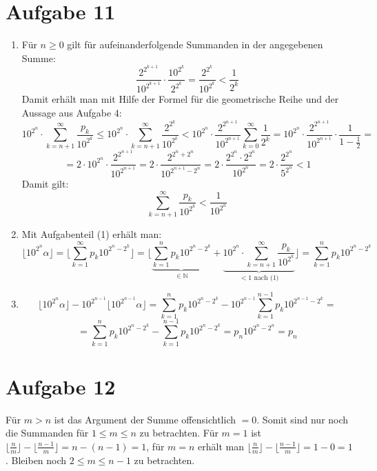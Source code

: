 \section*{Aufgabe 11}
\begin{enumerate}[(1)]

\item Für $n \geq 0 $ gilt für aufeinanderfolgende Summanden in der angegebenen Summe:
\[   \frac{2^{2^{k+1}}}{10^{2^{k+1}}} \cdot \frac{10^{2^{k}}}{2^{2^{k}}}  = \frac{2^{2^{k}}}{10^{2^{k}}} < \frac{1}{2^k} \]
Damit erhält man mit Hilfe der Formel für die geometrische Reihe und der Aussage aus Aufgabe 4:
\[ 10^{2^{n}} \cdot \sum_{k = n+1}^{\infty}{\frac{p_k}{10^{2^k}}} \leq 10^{2^{n}} \cdot  \sum_{k = n+1}^{\infty}{\frac{2^{2^k}}{10^{2^k}}} < 10^{2^{n}} \cdot  \frac{2^{2^{n+1}}}{10^{2^{n+1}}} \sum_{k=0}^{\infty} {\frac{1}{2^k}} =  10^{2^{n}} \cdot \frac{2^{2^{n+1}}}{10^{2^{n+1}}} \cdot \frac{1}{1 - \frac{1}{2}}  = \]
\[ = 2 \cdot 10^{2^{n}} \cdot \frac{2^{2^{n+1}}}{10^{2^{n+1}}}  = 2 \cdot \frac{2^{2^n + 2^n}}{10^{2^{n+1} - 2^n}} = 2 \cdot \frac{2^{2^n} \cdot 2^{2^n}}{10^{2^n}} = 2 \cdot \frac{2^{2^n}}{5^{2^n}} < 1 \]
Damit gilt:
\[ \sum_{k = n+1}^{\infty}{\frac{p_k}{10^{2^k}}} < \frac{1}{10^{2^{n}}} \]

\item Mit Aufgabenteil (1) erhält man:
\[ \lfloor 10^{2^n} \alpha \rfloor = \lfloor \sum_{k=1}^{\infty} {p_k 10^{2^n - 2^k}} \rfloor = \lfloor \underbrace{\sum_{k=1}^{n} {p_k 10^{2^n - 2^k}}}_{\in \mathbb{N}}  + \underbrace{10^{2^n} \cdot \sum_{k=n+1}^{\infty} {\frac{p_k }{10^{2^k}}}}_{< 1 \text{ nach (1)}} \rfloor = \sum_{k=1}^{n} {p_k 10^{2^n - 2^k}}\]

\item
\[ \lfloor 10^{2^n}  \alpha   \rfloor  -   10^{2^{n-1}}  \lfloor 10^{2^{n-1}}  \alpha  \rfloor = \sum_{k=1}^{n} {p_k 10^{2^n - 2^k}}   -  10^{2^{n-1}} \sum_{k=1}^{n-1} {p_k 10^{2^{n-1} - 2^k}}  =  \]
\[ =  \sum_{k=1}^{n} {p_k 10^{2^n - 2^k}}   -   \sum_{k=1}^{n-1} {p_k 10^{2^n - 2^k}} = p_n 10^{2^n - 2^n} = p_n \]
\end{enumerate}


\section*{Aufgabe 12}

Für $m > n$ ist das Argument der Summe offensichtlich $= 0$. Somit sind nur noch die Summanden für $ 1 \leq m \leq n$ zu betrachten.
Für $m = 1$ ist $ \lfloor \frac{n}{m} \rfloor - \lfloor \frac{n-1}{m} \rfloor = n - (n-1) = 1$, für $m = n$ erhält man $ \lfloor \frac{n}{m} \rfloor - \lfloor \frac{n-1}{m} \rfloor = 1 - 0 = 1$.
Bleiben noch $2 \leq m \leq n-1$ zu betrachten.

